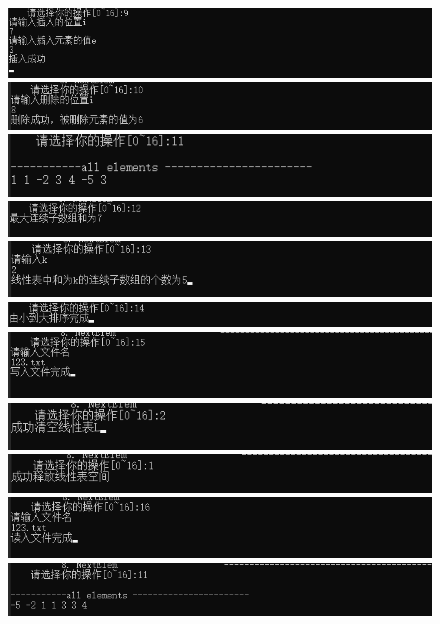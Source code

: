 \documentclass[supercite]{Experimental_Report}
\theoremstyle{definition}
\begin{document}
\begin{sloppypar}
\begin{figure}[H]
	\includegraphics[width=16cm]{pic1//9.png}
	\includegraphics[width=16cm]{pic1//10.png}
	\includegraphics[width=16cm]{pic1//11.png}
	\includegraphics[width=16cm]{pic1//12.png}
	\includegraphics[width=16cm]{pic1//13.png}
	\includegraphics[width=16cm]{pic1//14.png}
	\includegraphics[width=16cm]{pic1//15.png}
	\includegraphics[width=16cm]{pic1//16.png}
	\includegraphics[width=16cm]{pic1//17.png}
	\includegraphics[width=16cm]{pic1//18.png}
	\includegraphics[width=16cm]{pic1//19.png}
\end{figure} 




\end{sloppypar}
\end{document}
